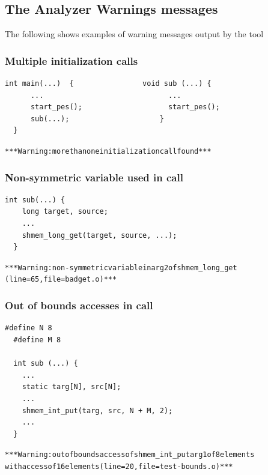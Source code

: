 \subsection{The \openshmem Analyzer Warnings messages}

The following shows examples of warning messages output by the tool

\subsubsection{Multiple \openshmem initialization calls}

\begin{lstlisting}[language=OSH+C]
  int main(...)  {                void sub (...) {
      ...                             ...
      start_pes();                    start_pes();       
      sub(...);                     } 
  }
\end{lstlisting}
\begin{alltt}
  *** \openshmem Warning: more than one \openshmem initialization call found ***
\end{alltt}

\subsubsection{Non-symmetric variable used in \openshmem call}

\begin{lstlisting}[language=OSH+C]
  int sub(...) {
    long target, source;
    ...
    shmem_long_get(target, source, ...);
  }
\end{lstlisting}
\begin{alltt}
  *** \openshmem Warning: non-symmetric variable in arg2 of shmem_long_get 
  (line=65, file=badget.o) ***
\end{alltt}

\subsubsection{Out of bounds accesses in \openshmem call}

\begin{lstlisting}[language=OSH+C]
  #define N 8
  #define M 8

  int sub (...) {
    ...
    static targ[N], src[N];
    ...
    shmem_int_put(targ, src, N + M, 2);
    ...
  }
\end{lstlisting}
\begin{alltt}
  *** \openshmem Warning: out of bounds access of shmem_int_put arg1 of 8 elements 
  with access of 16 elements (line=20, file=test-bounds.o) ***
\end{alltt}

